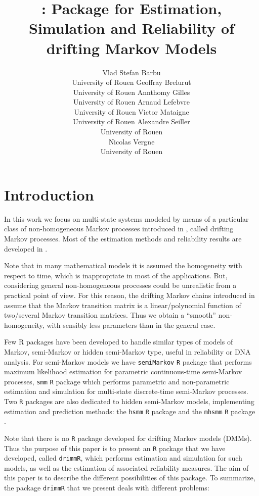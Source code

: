 \documentclass[article,nojss]{jss}\usepackage[]{graphicx}\usepackage[]{color}
\author{
Vlad Stefan Barbu\\University of Rouen \And Geoffray Brelurut\\University of Rouen \And Annthomy Gilles\\University of Rouen
\AND Arnaud Lefebvre\\University of Rouen \And Victor Mataigne \\University of Rouen \And Alexandre Seiller \\University of Rouen \\ \And Nicolas Vergne\\University of Rouen \\
}
\title{\pkg{drimmR} : \proglang{R} Package for Estimation, Simulation and Reliability of drifting Markov Models}%
\begin{document}
\section{Introduction}

In this work we focus on multi-state systems modeled by means of a particular class of non-homogeneous Markov processes introduced in \citet{Ver08}, called drifting Markov processes. Most of the estimation methods and reliability results are developed in \citet{BaVe2018}.

Note that in many mathematical models it is assumed the homogeneity with respect to time, which is inappropriate in most of the applications. But, considering general non-homogeneous processes could be unrealistic from a practical point of view. For this reason, the drifting Markov chains introduced in  \citet{Ver08} assume that the Markov transition matrix is a linear/polynomial function of two/several Markov transition matrices.  Thus we obtain  a ``smooth'' non-homogeneity, with sensibly less parameters than in the general case.

Few R packages have been developed to handle similar types of models of Markov, semi-Markov or hidden semi-Markov type, useful in reliability or DNA analysis. For semi-Markov models we have {\tt semiMarkov} {\tt R} package \citet{krol_semimarkov_2015} that performs maximum likelihood estimation for parametric continuous-time semi-Markov processes, {\tt smm}  {\tt R} package \citep{BaBeCeSaVe} which performs parametric and non-parametric estimation and simulation for multi-state discrete-time semi-Markov processes. Two  {\tt R} packages are also dedicated to hidden semi-Markov models, implementing estimation and prediction methods: the {\tt hsmm} {\tt R} package \citet{bulla_hsmm_2010} and  the {\tt mhsmm}  {\tt R} package \citet{oconnell_hidden_2011}.

Note that there is no {\tt R} package  developed for drifting Markov models (DMMs). Thus the purpose of this paper is to present an {\tt R} package that we have developed, called {\tt drimmR}, which performs estimation and simulation for such models, as well as the estimation of associated reliability measures. The aim of this paper is to describe the different possibilities of this package. To summarize, the package {\tt drimmR} that we present deals with different problems:
\end{document}
